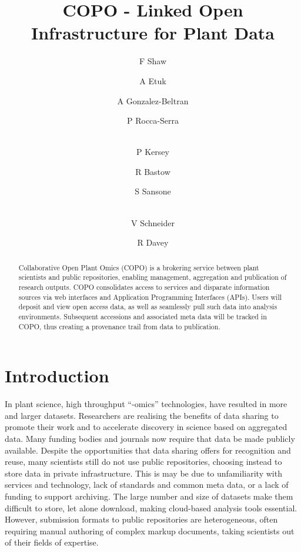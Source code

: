 \documentclass[runningheads,a4paper]{llncs}
\begin{document}
\title{COPO - Linked Open Infrastructure for Plant Data}

\author{F Shaw  \and A Etuk  \and A Gonzalez-Beltran
  \and P Rocca-Serra \and\\
  P  Kersey \and R Bastow  \and S Sansone \and\\
  V Schneider \and R Davey }
%


\maketitle

\vspace*{-0.2in}
\begin{abstract}
Collaborative Open Plant Omics (COPO) is a brokering service between plant scientists and public repositories, enabling management, aggregation and publication of research outputs. COPO consolidates access to services and disparate information sources via web interfaces and Application Programming Interfaces (APIs). Users will deposit and view open access data, as well as seamlessly pull such data into analysis environments. Subsequent accessions and associated meta data will be tracked in COPO, thus creating a provenance trail from data to publication.
\end{abstract}

\vspace*{-0.3in}
\section{Introduction}

In plant science, high throughput “-omics” technologies, have resulted in more and larger datasets. Researchers are realising the benefits of data sharing to promote their work and to accelerate discovery in science based on aggregated data. Many funding bodies and journals now require that data be made publicly available. Despite the opportunities that data sharing offers for recognition and reuse, many
scientists still do not use public repositories, choosing instead to store data in private infrastructure. This is may be due to unfamiliarity with services and technology, lack of standards and common meta data, or a lack of funding to support archiving. The large number and size of datasets make them difficult to
store, let alone download, making cloud-based analysis tools essential. However, submission formats to public repositories are heterogeneous, often requiring manual authoring of complex markup documents, taking scientists out of their fields of expertise.
\end{document}
